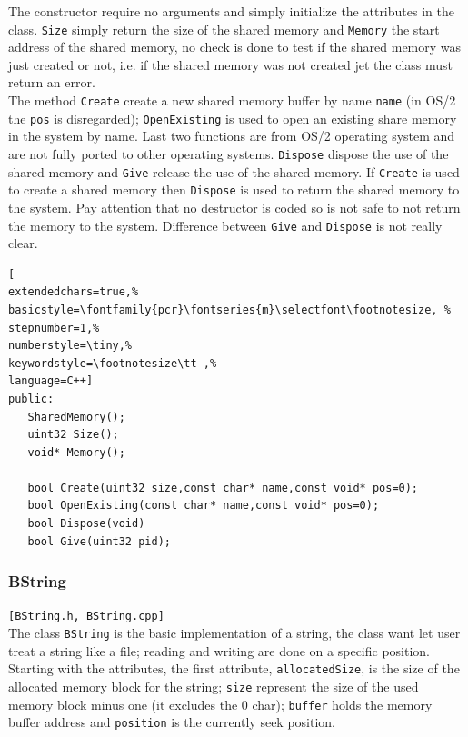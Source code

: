The constructor require no arguments and simply initialize the attributes in the class. \texttt{Size} simply return the size of the shared memory and \texttt{Memory} the start address of the shared memory, no check is done to test if the shared memory was just created or not, i.e. if the shared memory was not created jet the class must return an error.\\


The method \texttt{Create} create a new shared memory buffer by name \texttt{name} (in OS/2 the \texttt{pos} is disregarded); \texttt{OpenExisting} is used to open an existing share memory in the system by name.
Last two functions are from OS/2 operating system and are not fully ported to other operating systems. \texttt{Dispose} dispose the use of the shared memory and \texttt{Give} release the use of the shared memory. If \texttt{Create} is used to create a shared memory then \texttt{Dispose} is used to return the shared memory to the system. Pay attention that no destructor is coded so is not safe to not return the memory to the system. Difference between \texttt{Give} and \texttt{Dispose} is not really clear.

\begin{lstlisting}[
extendedchars=true,%
basicstyle=\fontfamily{pcr}\fontseries{m}\selectfont\footnotesize, %
stepnumber=1,%
numberstyle=\tiny,%
keywordstyle=\footnotesize\tt ,%
language=C++]
public:
   SharedMemory();
   uint32 Size();
   void* Memory();

   bool Create(uint32 size,const char* name,const void* pos=0);
   bool OpenExisting(const char* name,const void* pos=0);
   bool Dispose(void)
   bool Give(uint32 pid);
\end{lstlisting}



\subsubsection{BString}
\texttt{[BString.h, BString.cpp]}\\
The class \texttt{BString} is the basic implementation of a string, the class want let user treat a string like a file; reading and writing are done on a specific position.\\


Starting with the attributes, the first attribute, \texttt{allocatedSize}, is the size of the allocated memory block for the string; \texttt{size} represent the size of the used memory block minus one (it excludes the 0 char); \texttt{buffer} holds the memory buffer address and \texttt{position} is the currently seek position.\\


